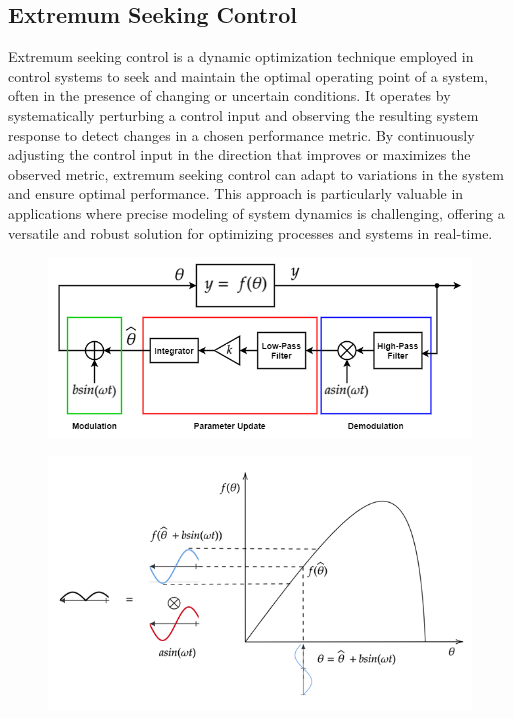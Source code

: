 \documentclass[nohyperref]{article}
\theoremstyle{plain}
\theoremstyle{definition}
\theoremstyle{remark}
\begin{document}
\subsection{Extremum Seeking Control}
Extremum seeking control is a dynamic optimization technique employed in control systems to seek and maintain the optimal operating point of a system, often in the presence of changing or uncertain conditions. It operates by systematically perturbing a control input and observing the resulting system response to detect changes in a chosen performance metric. By continuously adjusting the control input in the direction that improves or maximizes the observed metric, extremum seeking control can adapt to variations in the system and ensure optimal performance. This approach is particularly valuable in applications where precise modeling of system dynamics is challenging, offering a versatile and robust solution for optimizing processes and systems in real-time.

\begin{figure}[ht]
\vskip 0.2in
\begin{center}
\centerline{\includegraphics[width=\columnwidth]{images/esc_static_optimization.png}}
\caption{}
\end{center}
\vskip -0.2in
\end{figure}

\begin{figure}[ht]
\vskip 0.2in
\begin{center}
\centerline{\includegraphics[width=\columnwidth]{images/esc_increasing_objective.png}}
\caption{}
\end{center}
\vskip -0.2in
\end{figure}
\end{document}
